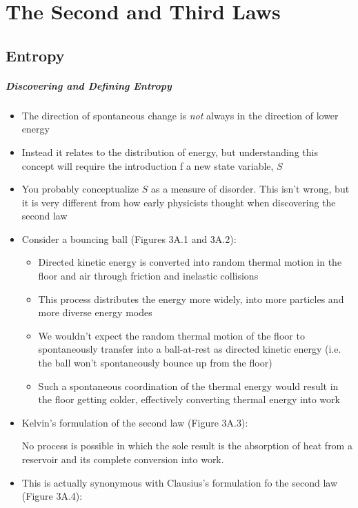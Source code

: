 \documentclass[12pt, openany, letterpaper]{memoir}
\begin{document}
\chapter{The Second and Third Laws}
\section{Entropy}
\paragraph{Discovering and Defining Entropy}
\begin{itemize}
	\item The direction of spontaneous change is \emph{not} always in the direction of lower energy
	\item Instead it relates to the distribution of energy, but understanding this concept will require the introduction f a new state variable, $S$
	\item You probably conceptualize $S$ as a measure of disorder. This isn't wrong, but it is very different from how early physicists thought when discovering the second law
	\item Consider a bouncing ball (Figures 3A.1 and 3A.2):
	\begin{itemize}
		\item Directed kinetic energy is converted into random thermal motion in the floor and air through friction and inelastic collisions
		\item This process distributes the energy more widely, into more particles and more diverse energy modes
		\item We wouldn't expect the random thermal motion of the floor to spontaneously transfer into a ball-at-rest as directed kinetic energy (i.e. the ball won't spontaneously bounce up from the floor)
		\item Such a spontaneous coordination of the thermal energy would result in the floor getting colder, effectively converting thermal energy into work
	\end{itemize} 
	\item Kelvin's formulation of the second law (Figure 3A.3):
	
	No process is possible in which the sole result is the absorption of heat from a reservoir and its complete conversion into work.
	
	\item This is actually synonymous with Clausius's formulation fo the second law (Figure 3A.4):
	

\end{itemize}
\end{document}
